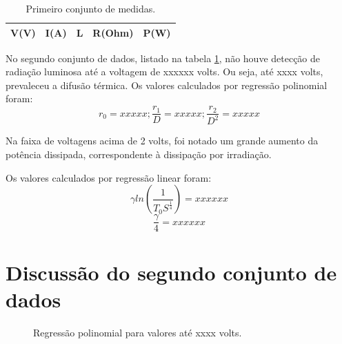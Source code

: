 \documentclass[brazilian,12pt,a4paper,final]{article}
\begin{document}
\begin{table}[htbp]
\centering
\begin{tabular}{|r|r|r|r|r|} 
\hline
V(V)    &       I(A)    &       L       &       R(Ohm)  &       P(W)    \\
\hline
 \hline
 \end{tabular}
 \caption{Primeiro conjunto de medidas.}
 \label{tabdados2}
\end{table}

No segundo conjunto de dados, listado na tabela \ref{tabdados2}, 
não houve detecção de radiação luminosa até a voltagem de xxxxxx volts.
Ou seja, até xxxx volts, prevaleceu a difusão térmica.
Os valores calculados por regressão polinomial foram:
$$r_0=xxxxx; \frac{r_1}{D}=xxxxx; \frac{r_2}{D^2}=xxxxx$$

Na faixa de voltagens acima de 2 volts, foi notado um grande aumento da
potência dissipada, correspondente à dissipação por irradiação.

Os valores calculados por regressão linear foram:
$$\gamma ln(\frac{1}{T_0S^\frac{1}{4}}) = xxxxxx$$
$$\frac{\gamma}{4}=xxxxxx$$

\section{Discussão do segundo conjunto de dados}

\begin{figure}[htbp!]
  \caption{Regressão polinomial para valores até xxxx volts.}
  \label{figiniciopeq2}
  \centering
\end{figure}
\end{document}
